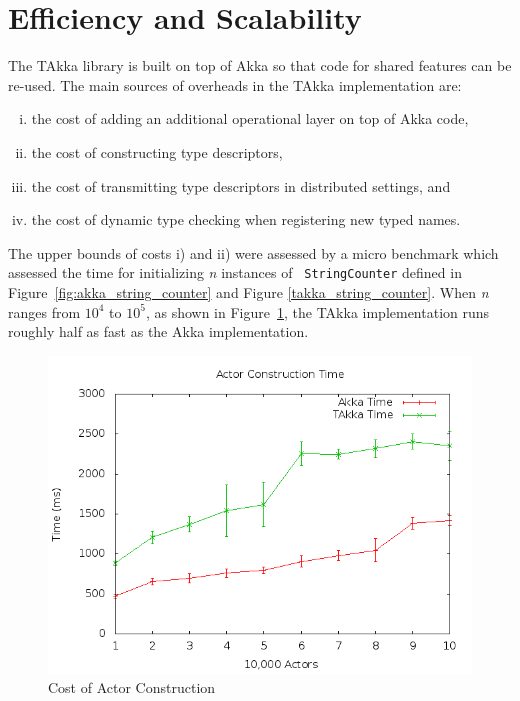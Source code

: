 \newpage
\section{Efficiency and Scalability}
\label{efficiency}




The TAkka library is built on top of Akka so that code for shared features 
can be re-used.  The main sources of overheads in the TAkka implementation
are:

\begin{enumerate}[i)]
  \item the cost of adding an additional operational layer on top of Akka 
code,
  \item the cost of constructing type descriptors,
  \item the cost of transmitting type descriptors in distributed settings, and
  \item the cost of dynamic type checking when registering new typed names.
\end{enumerate}

The upper bounds of costs i) and ii) were assessed by a micro 
benchmark which assessed the time for initializing {\it n} instances of {\tt 
StringCounter} defined in Figure~\ref{fig:akka_string_counter} and Figure 
\ref{takka_string_counter}. When {\it n} ranges from $10^4$ to $10^5$, as 
shown in Figure~\ref{cost_of_type}, the TAkka implementation runs roughly 
half as fast as the Akka implementation.  


\vspace{15pt}
\begin{figure}[h]
\begin{center}
\includegraphics[scale=0.6]{efficiency/Actor_Construction.png}
\caption{Cost of Actor Construction}
\label{cost_of_type}
\end{center}
\end{figure}

